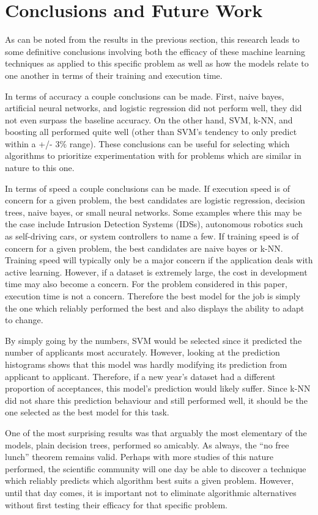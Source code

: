 \chapter{Conclusions and Future Work}
As can be noted from the results in the previous section, this research leads to some definitive conclusions involving both the efficacy of these machine learning techniques as applied to this specific problem as well as how the models relate to one another in terms of their training and execution time.

In terms of accuracy a couple conclusions can be made. First, naive bayes, artificial neural networks, and logistic regression did not perform well, they did not even surpass the baseline accuracy. On the other hand, SVM, k-NN, and boosting all performed quite well (other than SVM's tendency to only predict within a +/- 3\% range). These conclusions can be useful for selecting which algorithms to prioritize experimentation with for problems which are similar in nature to this one.

In terms of speed a couple conclusions can be made. If execution speed is of concern for a given problem, the best candidates are logistic regression, decision trees, naive bayes, or small neural networks. Some examples where this may be the case include Intrusion Detection Systems (IDSs), autonomous robotics such as self-driving cars, or system controllers to name a few. If training speed is of concern for a given problem, the best candidates are naive bayes or k-NN. Training speed will typically only be a major concern if the application deals with active learning. However, if a dataset is extremely large, the cost in development time may also become a concern. For the problem considered in this paper, execution time is not a concern. Therefore the best model for the job is simply the one which reliably performed the best and also displays the ability to adapt to change.

By simply going by the numbers, SVM would be selected since it predicted the number of applicants most accurately. However, looking at the prediction histograms shows that this model was hardly modifying its prediction from applicant to applicant. Therefore, if a new year's dataset had a different proportion of acceptances, this model's prediction would likely suffer. Since k-NN did not share this prediction behaviour and still performed well, it should be the one selected as the best model for this task.

One of the most surprising results was that arguably the most elementary of the models, plain decision trees, performed so amicably. As always, the ``no free lunch'' theorem remains valid. Perhaps with more studies of this nature performed, the scientific community will one day be able to discover a technique which reliably predicts which algorithm best suits a given problem. However, until that day comes, it is important not to eliminate algorithmic alternatives without first testing their efficacy for that specific problem.